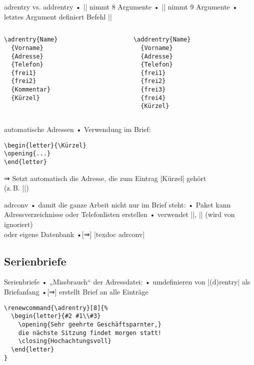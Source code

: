 \begin{frame}[fragile]{adrentry vs. addrentry}
• |\adrentry| nimmt 8 Argumente
• |\addrentry| nimmt 9 Argumente
• letztes Argument definiert Befehl ||
\•
\begin{columns}
\begin{column}{.1\textwidth}
\begin{verbatim}
\adrentry{Name}
  {Vorname}
  {Adresse}
  {Telefon}
  {frei1}
  {frei2}
  {Kommentar}
  {Kürzel}
\end{verbatim}
\end{column}
\begin{column}{.1\textwidth}
\begin{verbatim}
\addrentry{Name}
  {Vorname}
  {Adresse}
  {Telefon}
  {frei1}
  {frei2}
  {frei3}
  {frei4}
  {Kürzel}
\end{verbatim}
\end{column}
\end{columns}
\end{frame}

\begin{frame}[fragile]{automatische Adressen}
• Verwendung im Brief:
\•
\begin{verbatim}
\begin{letter}{\Kürzel}
\opening{...}
\end{letter}
\end{verbatim}
⇒ Setzt automatisch die Adresse, die zum Eintrag |Kürzel| gehört\\
(z.\,B. |\ATRAUT|)
\end{frame}

\begin{frame}[fragile]{adrconv}
• damit die ganze Arbeit nicht nur im Brief steht:
• Paket  kann Adressverzeichnisse oder Telefonlisten erstellen
• verwendet |\adrentry|, || (wird von  ignoriert)\\%
oder eigene Datenbank
•[⇒] |texdoc adrconv|
\•
\end{frame}

\subsection{Serienbriefe}
\begin{frame}[fragile]{Serienbriefe}
• „Missbrauch“ der Adressdatei:
• umdefinieren von |\ad(d)rentry| als Briefanfang
•[⇒] erstellt Brief an alle Einträge
\•
\pause
\begin{verbatim}
\renewcommand{\adrentry}[8]{%
  \begin{letter}{#2 #1\\#3}
    \opening{Sehr geehrte Geschäftsparnter,}
    die nächste Sitzung findet morgen statt!
    \closing{Hochachtungsvoll}
  \end{letter}
}

\end{verbatim}
\end{frame}

